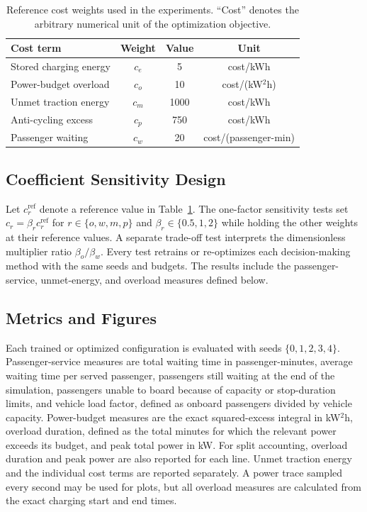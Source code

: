 \documentclass[conference]{IEEEtran}
\begin{document}
\begin{table}[t]
\centering
\caption{Reference cost weights used in the experiments. ``Cost'' denotes the arbitrary numerical unit of the optimization objective.}
\label{tab:cost_weights}
\footnotesize
\setlength{\tabcolsep}{3pt}
\begin{tabular}{lccc}
\toprule
Cost term & Weight & Value & Unit \\
\midrule
Stored charging energy & $c_e$ & 5 & cost/kWh \\
Power-budget overload & $c_o$ & 10 & cost/(kW$^2$h) \\
Unmet traction energy & $c_m$ & 1000 & cost/kWh \\
Anti-cycling excess & $c_p$ & 750 & cost/kWh \\
Passenger waiting & $c_w$ & 20 & cost/(passenger-min) \\
\bottomrule
\end{tabular}
\end{table}

\subsection{Coefficient Sensitivity Design}
Let $c_r^{\mathrm{ref}}$ denote a reference value in Table~\ref{tab:cost_weights}. The one-factor sensitivity tests set $c_r=\beta_r c_r^{\mathrm{ref}}$ for $r\in\{o,w,m,p\}$ and $\beta_r\in\{0.5,1,2\}$ while holding the other weights at their reference values. A separate trade-off test interprets the dimensionless multiplier ratio $\beta_o/\beta_w$. Every test retrains or re-optimizes each decision-making method with the same seeds and budgets. The results include the passenger-service, unmet-energy, and overload measures defined below.

\subsection{Metrics and Figures}
Each trained or optimized configuration is evaluated with seeds $\{0,1,2,3,4\}$. Passenger-service measures are total waiting time in passenger-minutes, average waiting time per served passenger, passengers still waiting at the end of the simulation, passengers unable to board because of capacity or stop-duration limits, and vehicle load factor, defined as onboard passengers divided by vehicle capacity. Power-budget measures are the exact squared-excess integral in kW$^2$h, overload duration, defined as the total minutes for which the relevant power exceeds its budget, and peak total power in kW. For split accounting, overload duration and peak power are also reported for each line. Unmet traction energy and the individual cost terms are reported separately. A power trace sampled every second may be used for plots, but all overload measures are calculated from the exact charging start and end times.
\end{document}
